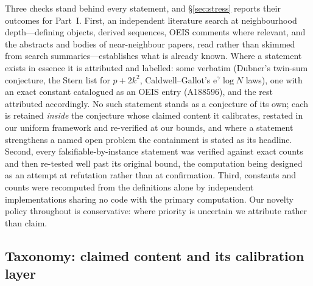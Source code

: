 \documentclass[11pt]{article}
\theoremstyle{definition}
\newcommand{\e}{\mathrm{e}}
\begin{document}
Three checks stand behind every statement, and \S\ref{sec:stress}
reports their outcomes for Part~I.  First, an independent literature
search at neighbourhood depth---defining objects, derived sequences,
OEIS comments where relevant, and the abstracts and bodies of
near-neighbour papers, read rather than skimmed from search
summaries---establishes what is already known.  Where a statement exists
in essence it is attributed and labelled: some verbatim (Dubner's
twin-sum conjecture, the Stern list for $p+2k^2$, Caldwell--Gallot's
$\e^{\gamma}\log N$ laws), one with an exact constant catalogued as an
OEIS entry (A188596), and the rest attributed accordingly.  No such
statement stands as a conjecture of its own; each is retained \emph{inside} the
conjecture whose claimed content it calibrates, restated in our uniform
framework and re-verified at our bounds, and where a statement
strengthens a named open problem the containment is stated as its
headline.  Second, every falsifiable-by-instance statement was verified
against exact counts and then re-tested well past its original bound,
the computation being designed as an attempt at refutation rather than
at confirmation.  Third, constants and counts were recomputed from the
definitions alone by independent implementations sharing no code with
the primary computation.  Our novelty policy throughout is conservative:
where priority is uncertain we attribute rather than claim.

\subsection*{Taxonomy: claimed content and its calibration layer}
\end{document}
